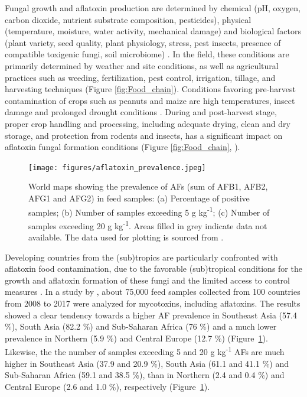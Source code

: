 Fungal growth and aflatoxin production are determined by chemical (pH, oxygen, carbon dioxide, nutrient substrate composition, pesticides), physical (temperature, moisture, water activity, mechanical damage) and biological factors (plant variety, seed quality, plant physiology, stress, pest insects, presence of compatible toxigenic fungi, soil microbiome) \citep{pleadin2019mycotoxins, bryden2012mycotoxin}. In the field, these conditions are primarily determined by weather and site conditions, as well as agricultural practices such as weeding, fertilization, pest control, irrigation, tillage, and harvesting techniques (Figure \ref{fig:Food_chain}). Conditions favoring pre-harvest contamination of crops such as peanuts and maize are high temperatures, insect damage and prolonged drought conditions \citep{bryden2012mycotoxin}. During and post-harvest stage, proper crop handling and processing, including adequate drying, clean and dry storage, and protection from rodents and insects, has a significant impact on aflatoxin fungal formation conditions (Figure \ref{fig:Food_chain}, \cite{kyei2021awareness}).

\begin{figure}[ht]
	\centering
	\texttt{[image: figures/aflatoxin\_prevalence.jpeg]}
	\decoRule
	\captionsetup{labelfont=bf, justification=justified, singlelinecheck=false, width=\textwidth}
	\caption{World maps showing the prevalence of AFs (sum of AFB1, AFB2, AFG1 and AFG2) in feed samples: (a) Percentage of positive samples; (b) Number of samples exceeding 5 \textmu{}g kg\textsuperscript{-1}; (c) Number of samples exceeding 20 \textmu{}g kg\textsuperscript{-1}. Areas filled in grey indicate data not available. The data used for plotting is sourced from \citet{gruber2019global}.}
	\label{fig:Aflatoxin_Prevalence}
\end{figure}
\afterpage{\FloatBarrier}

Developing countries from the (sub)tropics are particularly confronted with aflatoxin food contamination, due to the favorable (sub)tropical conditions for the growth and aflatoxin formation of these fungi and the limited access to control measures \citep{gbashi2018socio, nji2022six}. In a study by \citet{gruber2019global}, about 75,000 feed samples collected from 100 countries from 2008 to 2017 were analyzed for mycotoxins, including aflatoxins. The results showed a clear tendency towards a higher AF prevalence in Southeast Asia (57.4 \%), South Asia (82.2 \%) and Sub-Saharan Africa (76 \%) and a much lower prevalence in Northern (5.9 \%) and Central Europe (12.7 \%) (Figure~\ref{fig:Aflatoxin_Prevalence}). Likewise, the the number of samples exceeding 5 and 20  \textmu{}g kg\textsuperscript{-1} AFs are much higher in Southeast Asia (37.9 and 20.9 \%),  South Asia (61.1 and 41.1 \%) and Sub-Saharan Africa (59.1 and 38.5 \%), than in Northern (2.4 and 0.4 \%) and Central Europe (2.6 and 1.0 \%), respectively (Figure~\ref{fig:Aflatoxin_Prevalence}). 



